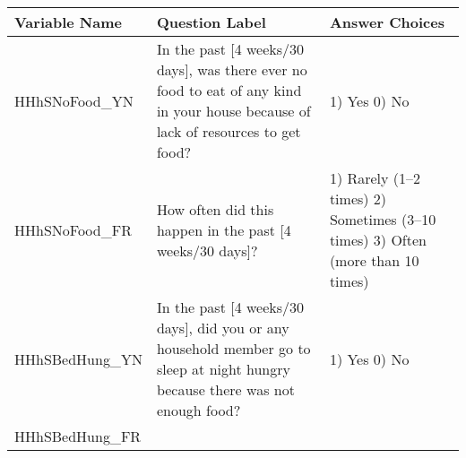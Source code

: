 \documentclass[
]{book}
\begin{document}
\begin{longtable}[]{@{}lll@{}}
\toprule
\begin{minipage}[b]{0.17\columnwidth}\raggedright
Variable Name\strut
\end{minipage} & \begin{minipage}[b]{0.56\columnwidth}\raggedright
Question Label\strut
\end{minipage} & \begin{minipage}[b]{0.17\columnwidth}\raggedright
Answer Choices\strut
\end{minipage}\tabularnewline
\midrule
\endhead
\begin{minipage}[t]{0.17\columnwidth}\raggedright
HHhSNoFood\_YN\strut
\end{minipage} & \begin{minipage}[t]{0.56\columnwidth}\raggedright
In the past {[}4 weeks/30 days{]}, was there ever no food to eat of any kind in your house because of lack of resources to get food?\strut
\end{minipage} & \begin{minipage}[t]{0.17\columnwidth}\raggedright
1) Yes 0) No\strut
\end{minipage}\tabularnewline
\begin{minipage}[t]{0.17\columnwidth}\raggedright
HHhSNoFood\_FR\strut
\end{minipage} & \begin{minipage}[t]{0.56\columnwidth}\raggedright
How often did this happen in the past {[}4 weeks/30 days{]}?\strut
\end{minipage} & \begin{minipage}[t]{0.17\columnwidth}\raggedright
1) Rarely (1--2 times) 2) Sometimes (3--10 times) 3) Often (more than 10 times)\strut
\end{minipage}\tabularnewline
\begin{minipage}[t]{0.17\columnwidth}\raggedright
HHhSBedHung\_YN\strut
\end{minipage} & \begin{minipage}[t]{0.56\columnwidth}\raggedright
In the past {[}4 weeks/30 days{]}, did you or any household member go to sleep at night hungry because there was not enough food?\strut
\end{minipage} & \begin{minipage}[t]{0.17\columnwidth}\raggedright
1) Yes 0) No\strut
\end{minipage}\tabularnewline
\begin{minipage}[t]{0.17\columnwidth}\raggedright
HHhSBedHung\_FR\strut

\end{minipage}
\end{longtable}
\end{document}
